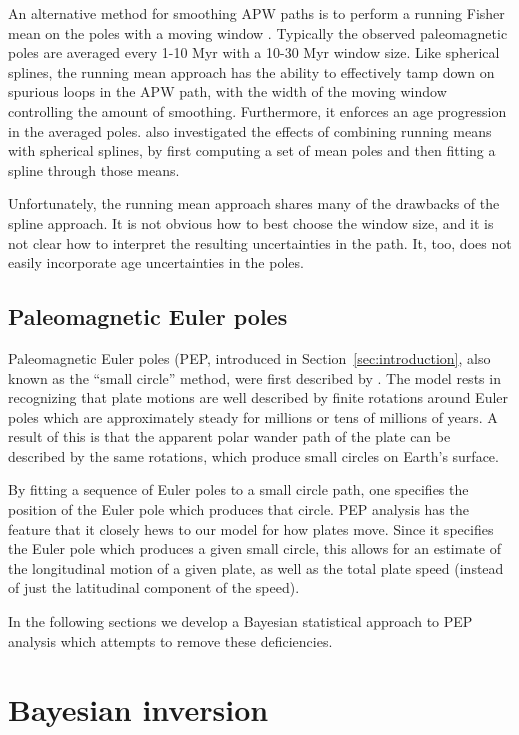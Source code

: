 \documentclass[preprint,12pt,authoryear]{elsarticle}
\begin{document}
An alternative method for smoothing APW paths is to perform a running Fisher
mean on the poles with a moving window \citep{van2001evidence, torsvik2008global}.
Typically the observed paleomagnetic poles are averaged every 1-10 Myr with a 10-30 Myr
window size. Like spherical splines, the running mean approach has the ability
to effectively tamp down on spurious loops in the APW path, with the width
of the moving window controlling the amount of smoothing.
Furthermore, it enforces an age progression in the averaged poles.
\citet{torsvik2008global} also investigated the effects of combining running means
with spherical splines, by first computing a set of mean poles and then
fitting a spline through those means.

Unfortunately, the running mean approach shares many of the drawbacks of the spline approach. 
It is not obvious how to best choose the window size, 
and it is not clear how to interpret the resulting uncertainties in the path.
It, too, does not easily incorporate age uncertainties in the poles.

\subsection{Paleomagnetic Euler poles}

Paleomagnetic Euler poles (PEP, introduced in Section~\ref{sec:introduction}, 
also known as the ``small circle'' method, were first described by \citet{gordon1984paleomagnetic}.
The model rests in recognizing that plate motions are well described by finite
rotations around Euler poles which are approximately steady for millions or 
tens of millions of years. A result of this is that the apparent polar
wander path of the plate can be described by the same rotations, which
produce small circles on Earth's surface.

By fitting a sequence of Euler poles to a small circle path, one specifies
the position of the Euler pole which produces that circle.
PEP analysis has the feature that it closely hews to our model for how plates move.
Since it specifies the Euler pole which produces a given small circle,
this allows for an estimate of the longitudinal motion of a given plate, 
as well as the total plate speed (instead of just the latitudinal component of the speed).

In the following sections we develop a Bayesian statistical approach to
PEP analysis which attempts to remove these deficiencies.

\section{Bayesian inversion}
\label{sec:bayesian_inversion}
\end{document}
